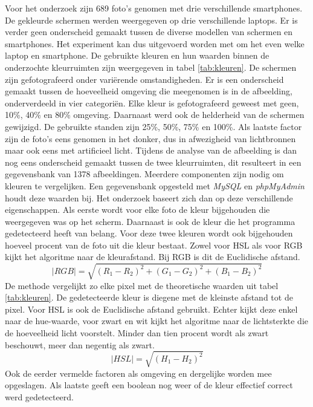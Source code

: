 Voor het onderzoek zijn 689 foto's genomen met drie verschillende smartphones. De gekleurde schermen werden weergegeven op drie verschillende laptops. Er is verder geen onderscheid gemaakt tussen de diverse modellen van schermen en smartphones. Het experiment kan dus uitgevoerd worden met om het even welke laptop en smartphone. De gebruikte kleuren en hun waarden binnen de onderzochte kleurruimten zijn weergegeven in tabel \ref{tab:kleuren}. De schermen zijn gefotografeerd onder variërende omstandigheden. Er is een onderscheid gemaakt tussen de hoeveelheid omgeving die meegenomen is in de afbeelding, onderverdeeld in vier categoriën. Elke kleur is gefotografeerd geweest met geen, 10\%, 40\% en 80\% omgeving. Daarnaast werd ook de helderheid van de schermen gewijzigd. De gebruikte standen zijn 25\%, 50\%, 75\% en 100\%. Als laatste factor zijn de foto's eens genomen in het donker, dus in afwezigheid van lichtbronnen maar ook eens met artificieel licht.  Tijdens de analyse van de afbeelding is dan nog eens onderscheid gemaakt tussen de twee kleurruimten, dit resulteert in een gegevensbank van 1378 afbeeldingen.  Meerdere componenten zijn nodig om kleuren te vergelijken. Een gegevensbank opgesteld met \textit{MySQL} en \textit{phpMyAdmin} houdt deze waarden bij. Het onderzoek baseert zich dan op deze verschillende eigenschappen. Als eerste wordt voor elke foto de kleur bijgehouden die weergegeven was op het scherm. Daarnaast is ook de kleur die het programma gedetecteerd heeft van belang. Voor deze twee kleuren wordt ook bijgehouden hoeveel procent van de foto uit die kleur bestaat. Zowel voor HSL als voor RGB kijkt het algoritme naar de kleurafstand. Bij RGB is dit de Euclidische afstand. 
$$ \mid RGB \mid = \sqrt{(R_1 - R_2)^2 + (G_1 - G_2)^2 + (B_1 - B_2)^2}$$
De methode vergelijkt zo elke pixel met de theoretische waarden uit tabel \ref{tab:kleuren}. De gedetecteerde kleur is diegene met de kleinste afstand tot de pixel. Voor HSL is ook de Euclidische afstand gebruikt. Echter kijkt deze enkel naar de hue-waarde, voor zwart en wit kijkt het algoritme naar de lichtsterkte die de hoeveelheid licht voorstelt. Minder dan tien procent wordt als zwart beschouwt, meer dan negentig als zwart. 
$$ \mid HSL \mid = \sqrt{(H_1 - H_2)^2 }$$
Ook de eerder vermelde factoren als omgeving en dergelijke worden mee opgeslagen. Als laatste geeft een boolean nog weer of de kleur effectief correct werd gedetecteerd.


